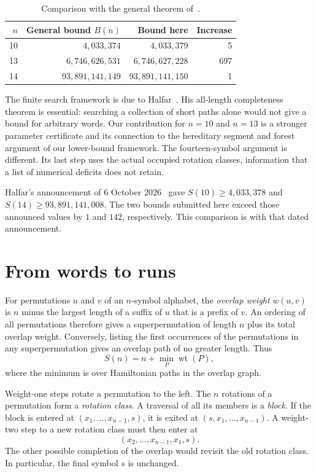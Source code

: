 \documentclass[11pt]{article}
\DeclareMathOperator{\wt}{wt}
\begin{document}
\begin{table}[ht]
\centering
\begin{tabular}{rrrr}
\toprule
$n$ & General bound $B(n)$ & Bound here & Increase\\
\midrule
10 & $4{,}033{,}374$ & $4{,}033{,}379$ & 5\\
13 & $6{,}746{,}626{,}531$ & $6{,}746{,}627{,}228$ & 697\\
14 & $93{,}891{,}141{,}149$ & $93{,}891{,}141{,}150$ & 1\\
\bottomrule
\end{tabular}
\caption{Comparison with the general theorem of~\cite{returns}.}
\end{table}

\enlargethispage{\baselineskip}
The finite search framework is due to Halfar~\cite{halfar}. His
all-length completeness theorem is essential: searching a collection of
short paths alone would not give a bound for arbitrary words. Our
contribution for $n=10$ and $n=13$ is a stronger parameter certificate
and its connection to the hereditary segment and forest argument of
our lower-bound framework. The fourteen-symbol argument is different.
Its last step uses the actual occupied rotation classes, information
that a list of numerical deficits does not retain.

Halfar's announcement of 6 October 2026~\cite{halfar-announcement}
gave $S(10)\ge4{,}033{,}378$ and $S(14)\ge93{,}891{,}141{,}008$.
The two bounds submitted here exceed those announced values by $1$
and $142$, respectively. This comparison is with that dated
announcement.

\section{From words to runs}
For permutations $u$ and $v$ of an $n$-symbol alphabet, the \emph{overlap
weight} $w(u,v)$ is $n$ minus the largest length of a suffix of $u$ that
is a prefix of $v$. An ordering of all permutations therefore gives a
superpermutation of length $n$ plus its total overlap weight. Conversely,
listing the first occurrences of the permutations in any superpermutation
gives an overlap path of no greater length. Thus
\[
 S(n)=n+\min_P\wt(P),
\]
where the minimum is over Hamiltonian paths in the overlap graph.

Weight-one steps rotate a permutation to the left. The $n$ rotations of
a permutation form a \emph{rotation class}. A traversal of all its members
is a \emph{block}. If the block is entered at
$(x_1,\ldots,x_{n-1},s)$, it is exited at
$(s,x_1,\ldots,x_{n-1})$. A weight-two step to a new rotation class must
then enter at
\[
 (x_2,\ldots,x_{n-1},x_1,s).
\]
The other possible completion of the overlap would revisit the old
rotation class. In particular, the final symbol $s$ is unchanged.
\end{document}
